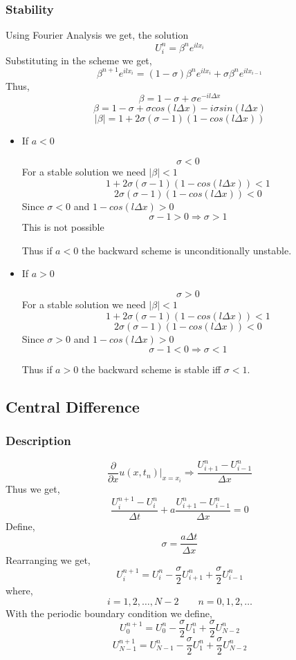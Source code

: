 \documentclass[11pt]{article}
\begin{document}
\subsubsection{Stability}
\label{sec:orge5fa827}

Using Fourier Analysis we get, the solution
$$U_i^n = \beta^n e^{i l x_i}$$
Substituting in the scheme we get,
$$\beta^{n+1} e^{i l x_i} = \left( 1 - \sigma \right) \beta^n e^{i l x_i} + \sigma \beta^n e^{i l x_{i-1}}$$
Thus,
$$\beta = 1 - \sigma + \sigma e^{- i l \Delta x}$$
$$\beta = 1 - \sigma + \sigma cos(l \Delta x) - i \sigma sin(l \Delta x)$$
$$\lvert \beta \rvert = 1 + 2 \sigma \left( \sigma -1 \right) \left( 1 - cos(l \Delta x) \right)$$

\begin{itemize}
\item If \(a<0\)

$$\sigma < 0$$
For a stable solution we need \(\lvert \beta \rvert < 1\)
$$1 + 2 \sigma \left( \sigma -1 \right) \left( 1 - cos(l \Delta x) \right) <1$$
$$2 \sigma \left( \sigma -1 \right) \left( 1 - cos(l \Delta x) \right) <0$$
Since \(\sigma <0\) and \(1 - cos(l \Delta x) > 0\)
$$\sigma - 1 > 0 \Rightarrow \sigma > 1$$
This is not possible

Thus if \(a<0\) the backward scheme is unconditionally unstable.

\item If \(a>0\)

$$\sigma > 0$$
For a stable solution we need \(\lvert \beta \rvert < 1\)
$$1 + 2 \sigma \left( \sigma -1 \right) \left( 1 - cos(l \Delta x) \right) <1$$
$$2 \sigma \left( \sigma -1 \right) \left( 1 - cos(l \Delta x) \right) <0$$
Since \(\sigma >0\) and \(1 - cos(l \Delta x) > 0\)
$$\sigma -1 < 0 \Rightarrow \sigma < 1$$

Thus if \(a>0\) the backward scheme is stable iff \(\sigma < 1\).
\end{itemize}
\subsection{Central Difference}
\label{sec:orgfaa94ed}
\subsubsection{Description}
\label{sec:orgc76c000}
$$\frac{\partial}{\partial x} u(x,t_n) \bigg|_{x=x_i} \Rightarrow \frac{U_{i+1}^n - U_{i-1}^n}{\Delta x}$$
Thus we get,
$$\frac{U_i^{n+1} - U_i^n}{\Delta t} + a \frac{U_{i+1}^{n} - U_{i-1}^n}{\Delta x} = 0$$
Define,
$$\sigma = \frac{a \Delta t}{\Delta x}$$
Rearranging we get,
$$U_i^{n+1} = U_i^n - \frac{\sigma}{2} U_{i+1}^n + \frac{\sigma}{2} U_{i-1}^n$$
where,
$$i=1,2,\ldots,N-2 \qquad n = 0,1,2,\ldots$$
With the periodic boundary condition we define,
$$U_0^{n+1} = U_0^n - \frac{\sigma}{2} U_{1}^n + \frac{\sigma}{2} U_{N-2}^n$$
$$U_{N-1}^{n+1} = U_{N-1}^n - \frac{\sigma}{2} U_{1}^n + \frac{\sigma}{2} U_{N-2}^n$$
\end{document}
